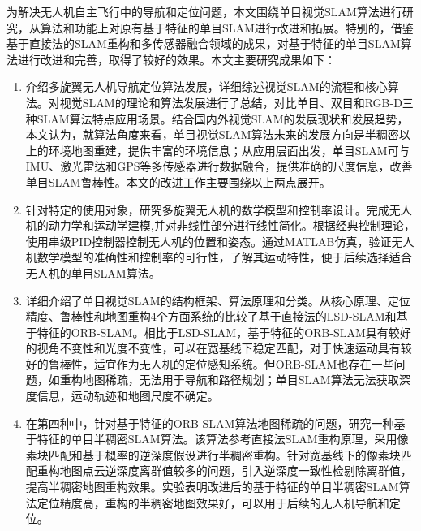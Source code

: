 


\begin{conclusion}
为解决无人机自主飞行中的导航和定位问题，本文围绕单目视觉SLAM算法进行研究，从算法和功能上对原有基于特征的单目SLAM进行改进和拓展。特别的，借鉴基于直接法的SLAM重构和多传感器融合领域的成果，对基于特征的单目SLAM算法进行改进和完善，取得了较好的效果。本文主要研究成果如下：

\begin{enumerate}  [label={(\arabic*)}]
\item 介绍多旋翼无人机导航定位算法发展，详细综述视觉SLAM的流程和核心算法。对视觉SLAM的理论和算法发展进行了总结，对比单目、双目和RGB-D三种SLAM算法特点应用场景。结合国内外视觉SLAM的发展现状和发展趋势，本文认为，就算法角度来看，单目视觉SLAM算法未来的发展方向是半稠密以上的环境地图重建，提供丰富的环境信息；从应用层面出发，单目SLAM可与IMU、激光雷达和GPS等多传感器进行数据融合，提供准确的尺度信息，改善单目SLAM鲁棒性。本文的改进工作主要围绕以上两点展开。

\item 针对特定的使用对象，研究多旋翼无人机的数学模型和控制率设计。完成无人机的动力学和运动学建模,并对非线性部分进行线性简化。根据经典控制理论，使用串级PID控制器控制无人机的位置和姿态。通过MATLAB仿真，验证无人机数学模型的准确性和控制率的可行性，了解其运动特性，便于后续选择适合无人机的单目SLAM算法。

\item 详细介绍了单目视觉SLAM的结构框架、算法原理和分类。从核心原理、定位精度、鲁棒性和地图重构4个方面系统的比较了基于直接法的LSD-SLAM和基于特征的ORB-SLAM。相比于LSD-SLAM，基于特征的ORB-SLAM具有较好的视角不变性和光度不变性，可以在宽基线下稳定匹配，对于快速运动具有较好的鲁棒性，适宜作为无人机的定位感知系统。但ORB-SLAM也存在一些问题，如重构地图稀疏，无法用于导航和路径规划；单目SLAM算法无法获取深度信息，运动轨迹和地图尺度不确定。

\item 在第四种中，针对基于特征的ORB-SLAM算法地图稀疏的问题，研究一种基于特征的单目半稠密SLAM算法。该算法参考直接法SLAM重构原理，采用像素块匹配和基于概率的逆深度假设进行半稠密重构。针对宽基线下的像素块匹配重构地图点云逆深度离群值较多的问题，引入逆深度一致性检剔除离群值，提高半稠密地图重构效果。实验表明改进后的基于特征的单目半稠密SLAM算法定位精度高，重构的半稠密地图效果好，可以用于后续的无人机导航和定位。


\end{enumerate}
\end{conclusion}

